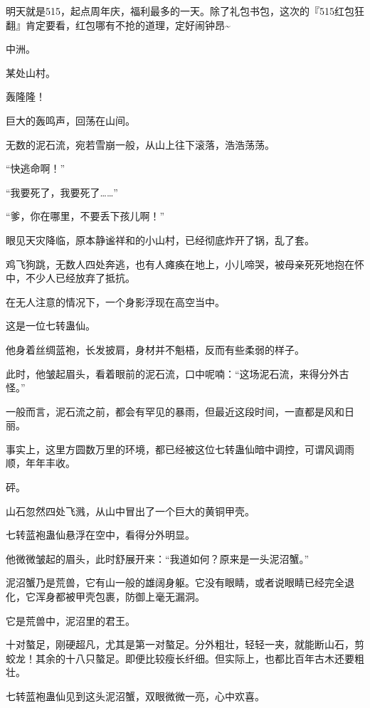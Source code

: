 
\begin{this_body}

明天就是515，起点周年庆，福利最多的一天。除了礼包书包，这次的『515红包狂翻』肯定要看，红包哪有不抢的道理，定好闹钟昂\~{}

中洲。

某处山村。

轰隆隆！

巨大的轰鸣声，回荡在山间。

无数的泥石流，宛若雪崩一般，从山上往下滚落，浩浩荡荡。

“快逃命啊！”

“我要死了，我要死了……”

“爹，你在哪里，不要丢下孩儿啊！”

眼见天灾降临，原本静谧祥和的小山村，已经彻底炸开了锅，乱了套。

鸡飞狗跳，无数人四处奔逃，也有人瘫痪在地上，小儿啼哭，被母亲死死地抱在怀中，不少人已经放弃了抵抗。

在无人注意的情况下，一个身影浮现在高空当中。

这是一位七转蛊仙。

他身着丝绸蓝袍，长发披肩，身材并不魁梧，反而有些柔弱的样子。

此时，他皱起眉头，看着眼前的泥石流，口中呢喃：“这场泥石流，来得分外古怪。”

一般而言，泥石流之前，都会有罕见的暴雨，但最近这段时间，一直都是风和日丽。

事实上，这里方圆数万里的环境，都已经被这位七转蛊仙暗中调控，可谓风调雨顺，年年丰收。

砰。

山石忽然四处飞溅，从山中冒出了一个巨大的黄铜甲壳。

七转蓝袍蛊仙悬浮在空中，看得分外明显。

他微微皱起的眉头，此时舒展开来：“我道如何？原来是一头泥沼蟹。”

泥沼蟹乃是荒兽，它有山一般的雄阔身躯。它没有眼睛，或者说眼睛已经完全退化，它浑身都被甲壳包裹，防御上毫无漏洞。

它是荒兽中，泥沼里的君王。

十对螯足，刚硬超凡，尤其是第一对螯足。分外粗壮，轻轻一夹，就能断山石，剪蛟龙！其余的十八只螯足。即便比较瘦长纤细。但实际上，也都比百年古木还要粗壮。

七转蓝袍蛊仙见到这头泥沼蟹，双眼微微一亮，心中欢喜。


\end{this_body}
